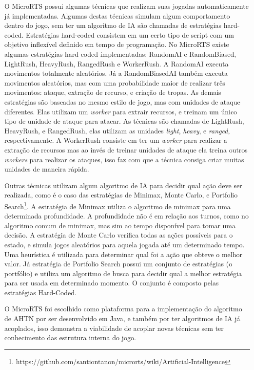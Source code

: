 O MicroRTS possui algumas técnicas que realizam suas jogadas automaticamente já implementadas.
Algumas destas técnicas simulam algum comportamento dentro do jogo, sem ter um algoritmo de IA são chamadas de estratégias hard-coded. 
Estratégias hard-coded consistem em um certo tipo de script com um objetivo inflexível definido em tempo de programação.
No MicroRTS existe algumas estratégias hard-coded implementadas: RandomAI e RandomBiased, LightRush, HeavyRush, RangedRush e WorkerRush.
A RandomAI executa movimentos totalmente aleatórios.
Já a RandomBiasedAI também executa movimentos aleatórios, mas com uma probabilidade maior de realizar três movimentos: ataque, extração de recurso, e criação de tropas.
As demais estratégias são baseadas no mesmo estilo de jogo, mas com unidades de ataque diferentes.
Elas utilizam um \textit{worker} para extrair recursos, e treinam um único tipo de unidade de ataque para atacar. 
As técnicas são chamadas de LightRush, HeavyRush, e RangedRush, elas utilizam as unidades \textit{light}, \textit{heavy}, e \textit{ranged}, respectivamente.
A WorkerRush consiste em ter um \textit{worker} para realizar a extração de recursos mas ao invés de treinar unidades de ataque ela treina outros \textit{workers} para realizar os ataques, isso faz com que a técnica consiga criar muitas unidades de maneira rápida.

Outras técnicas utilizam algum algoritmo de IA para decidir qual ação deve ser realizada, como é o caso das estratégias de Minimax\cite{ontanon2012minimax}, Monte Carlo, e Portfolio Search\footnote{https://github.com/santiontanon/microrts/wiki/Artificial-Intelligence}.
A estratégia de Minimax utiliza o algoritmo de minimax para uma determinada profundidade. A profundidade não é em relação aos turnos, como no algoritmo comum de minimax, mas sim ao tempo disponível para tomar uma decisão.
A estratégia de Monte Carlo verifica todas as ações possíveis para o estado, e simula jogos aleatórios para aquela jogada até um determinado tempo. Uma heurística é utilizada para determinar qual foi a ação que obteve o melhor valor.
Já estratégia de Portfolio Search possui um conjunto de estratégias (o portfólio) e utiliza um algoritmo de busca para decidir qual a melhor estratégia para ser usada em determinado momento. 
O conjunto é composto pelas estratégias Hard-Coded.

O MicroRTS foi escolhido como plataforma para a implementação do algoritmo de AHTN por ser desenvolvido em Java, e também por ter algoritmos de IA já acoplados, isso demonstra a viabilidade de acoplar novas técnicas sem ter conhecimento das estrutura interna do jogo.

